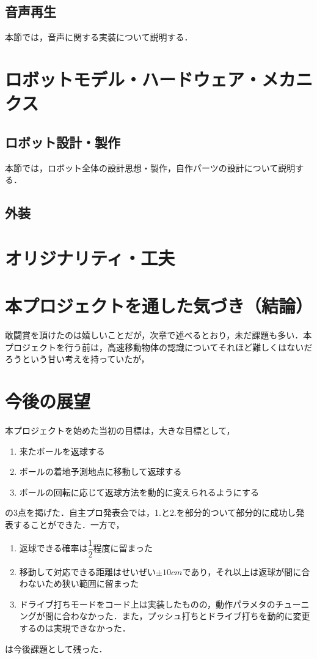 \documentclass[10pt, oneside, titlepage]{ltjarticle}  %
\begin{document}
\subsection{音声再生}
本節では，音声に関する実装について説明する．\cite{sound}
\section{ロボットモデル・ハードウェア・メカニクス}
\subsection{ロボット設計・製作}
本節では，ロボット全体の設計思想・製作，自作パーツの設計について説明する．

\subsection{外装}

\section{オリジナリティ・工夫}

\section{本プロジェクトを通した気づき（結論）}
敢闘賞を頂けたのは嬉しいことだが，次章で述べるとおり，未だ課題も多い．本プロジェクトを行う前は，高速移動物体の認識についてそれほど難しくはないだろうという甘い考えを持っていたが，


\section{今後の展望}
本プロジェクトを始めた当初の目標は，大きな目標として，
\begin{enumerate}
  \item 来たボールを返球する
  \item ボールの着地予測地点に移動して返球する
  \item ボールの回転に応じて返球方法を動的に変えられるようにする
\end{enumerate}
の3点を掲げた．自主プロ発表会では，1.と2.を部分的ついて部分的に成功し発表することができた．一方で，
\begin{enumerate}
\item 返球できる確率は$\dfrac{1}{2}$程度に留まった
\item 移動して対応できる距離はせいぜい$\pm 10 cm$であり，それ以上は返球が間に合わないため狭い範囲に留まった
\item ドライブ打ちモードをコード上は実装したものの，動作パラメタのチューニングが間に合わなかった．また，プッシュ打ちとドライブ打ちを動的に変更するのは実現できなかった．
\end{enumerate}
は今後課題として残った．
\end{document}
